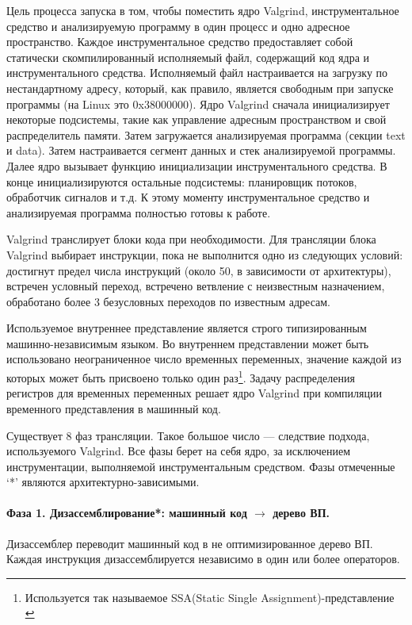 \documentclass[a4paper,12pt,russian]{article}
\newcommand{\code}[1]{\textsf{#1}}
\begin{document}
Цель процесса запуска в том, чтобы поместить ядро \code{Valgrind}, инструментальное средство и анализируемую программу в один процесс и одно адресное пространство. Каждое инструментальное средство предоставляет собой статически скомпилированный исполняемый файл, содержащий код ядра и инструментального средства. Исполняемый файл настраивается на загрузку по нестандартному адресу, который, как правило, является свободным при запуске программы (на Linux это \code{0x38000000}). Ядро \code{Valgrind} сначала инициализирует некоторые подсистемы, такие как управление адресным пространством и свой распределитель памяти. Затем загружается анализируемая программа (секции \code{text} и \code{data}). Затем настраивается сегмент данных и стек анализируемой программы. Далее ядро вызывает функцию инициализации инструментального средства. В конце инициализируются остальные подсистемы: планировщик потоков, обработчик сигналов и т.д. К этому моменту инструментальное средство и анализируемая программа полностью готовы к работе.

\code{Valgrind} транслирует блоки кода при необходимости. Для трансляции блока \code{Valgrind} выбирает инструкции, пока не выполнится одно из следующих условий: достигнут предел числа инструкций (около 50, в зависимости от архитектуры), встречен условный переход, встречено ветвление с неизвестным назначением, обработано более 3 безусловных переходов по известным адресам.

Используемое внутреннее представление является строго типизированным машинно-независимым языком. Во внутреннем представлении может быть использовано неограниченное число временных переменных, значение каждой из которых может быть присвоено только один раз\footnote{Используется так называемое SSA(Static Single Assignment)-представление \cite{aho_compilers}}. Задачу распределения регистров для временных переменных решает ядро \code{Valgrind} при компиляции временного представления в машинный код.

Существует 8 фаз трансляции. Такое большое число --- следствие подхода, используемого \code{Valgrind}. Все фазы берет на себя ядро, за исключением инструментации, выполняемой инструментальным средством. Фазы отмеченные `*' являются архитектурно-зависимыми.

\paragraph{Фаза 1. Дизассемблирование*: машинный код $\longrightarrow$ дерево ВП.}
Дизассемблер переводит машинный код в не оптимизированное дерево ВП. Каждая инструкция дизассемблируется независимо в один или более операторов.
\end{document}

